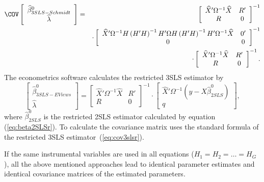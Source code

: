 \begin{eqnarray}
   \COV
   \left[ \begin{array}{c}
      \widehat{\beta}^0_{3SLS-Schmidt} \\ \widehat{\lambda}
   \end{array} \right] 
   & = & 
   \left[ \begin{array}{cc}
      \widehat{X}' \Omega^{-1} \widehat{X} & R' \\ 
      R & 0
   \end{array} \right]^{-1}
   \\
   & & \cdot
   \left[ \begin{array}{cc}
      \widehat{X}' \Omega^{-1} H \left( H' H \right)^{-1} H' \Omega
      H \left( H' H \right)^{-1} H' \Omega^{-1} \widehat{X} & 0' \\ 
      0 & 0
   \end{array} \right]^{-1}
   \nonumber \\
   & & \cdot
   \left[ \begin{array}{cc}
      \widehat{X}' \Omega^{-1} \widehat{X} & R' \\ 
      R & 0
   \end{array} \right]^{-1} .
   \nonumber
\end{eqnarray}
The econometrics software  calculates the restricted 3SLS estimator by
\begin{equation}
   \left[ \begin{array}{c}
      \widehat{\beta}^0_{3SLS-EViews} \\ \widehat{\lambda}
   \end{array} \right]
   =
   \left[ \begin{array}{cc}
      \widehat{X}' \Omega^{-1} \widehat{X} & R' \\ 
      R & 0
   \end{array} \right]^{-1}
   \cdot
   \left[ \begin{array}{c}
      \widehat{X}' \Omega^{-1} \left( y - X \widehat{\beta}^0_{2SLS} \right)
      \\ q 
   \end{array} \right] ,
   \label{eq:3slsEViewsR}
\end{equation}
where $\widehat{\beta}^0_{2SLS}$ is the restricted 2SLS estimator calculated
by equation (\ref{eq:beta2SLSr}). 
To calculate the covariance matrix
 uses the standard formula of the restricted 3SLS
estimator~(\ref{eq:cov3slsr}).


If the same instrumental variables are used in all equations 
($H_1 = H_2 = \ldots = H_G$), 
all the above mentioned approaches lead to identical parameter estimates
and identical covariance matrices of the estimated parameters.

